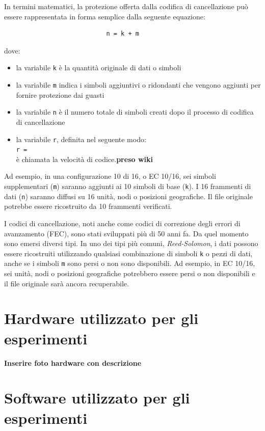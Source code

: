 In termini matematici, la protezione offerta dalla codifica di cancellazione pu\`{o} essere rappresentata in forma semplice dalla seguente equazione:  
\begin{verbatim}
                       		n = k + m
\end{verbatim}
dove:
\begin{itemize}
\item 
la variabile \verb"k" \`{e} la quantit\`{a} originale di dati o simboli 
\item
la variabile \verb"m" indica i simboli aggiuntivi o ridondanti che vengono aggiunti per fornire protezione dai guasti
\item
la variabile \verb"n" \`{e} il numero totale di simboli creati dopo il processo di codifica di cancellazione\cite{etichetta11}
\item
la variabile \verb"r", definita nel seguente modo: \\
                       		\verb"r = "\\
\`{e} chiamata la velocit\`{a} di codice.\textbf{preso wiki}
\end{itemize}

Ad esempio, in una configurazione 10 di 16, o EC 10/16, sei simboli supplementari (\verb"m") saranno aggiunti ai 10 simboli di base (\verb"k"). I 16 frammenti di dati (\verb"n") saranno diffusi su 16 unit\`{a}, nodi o posizioni geografiche. Il file originale potrebbe essere ricostruito da 10 frammenti verificati.\cite{etichetta11}

I codici di cancellazione, noti anche come codici di correzione degli errori di avanzamento (FEC), sono stati sviluppati pi\`{u} di 50 anni fa. Da quel momento sono emersi diversi tipi. In uno dei tipi pi\`{u} comuni, \textit{Reed-Solomon}, i dati possono essere ricostruiti utilizzando qualsiasi combinazione di simboli \verb"k" o pezzi di dati, anche se i simboli \verb"m" sono persi o non sono disponibili. Ad esempio, in EC 10/16, sei unit\`{a}, nodi o posizioni geografiche potrebbero essere persi o non disponibili e il file originale sar\`{a} ancora recuperabile.\cite{etichetta11}
 
\item
\section{Hardware utilizzato per gli esperimenti}
\textbf{Inserire foto hardware con descrizione}
\item
\section{Software utilizzato per gli esperimenti}
\item
